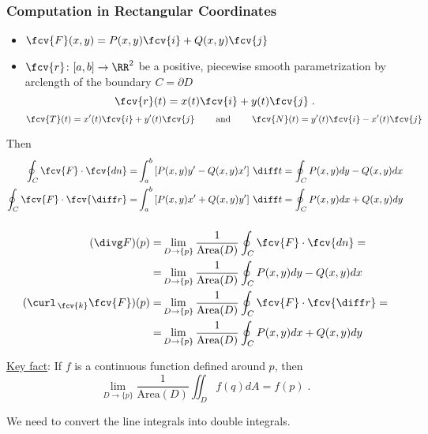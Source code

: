 \begin{frame}
  \frametitle{Computation in Rectangular Coordinates}
\small
\begin{itemize}
  \item $\fcv{F} (x,y) = P(x,y) \fcv{i} + Q(x,y) \fcv{j}$
  \item $\fcv{r} \colon [a,b] \to \RR^2$ be a positive, piecewise smooth parametrization by arclength of the boundary $C = \partial D$
%
$$\fcv{r}(t) = x(t) \fcv{i} + y(t) \fcv{j} \; .$$
%
$$
  \fcv{T} (t)  = x'(t) \fcv{i} + y'(t) \fcv{j} \qquad \text{ and } \qquad
  \fcv{N} (t)  = y'(t) \fcv{i} - x'(t) \fcv{j}
$$
%
\end{itemize}

Then
%
\begin{align*}
  \oint_C \fcv{F} \cdot \fcv{dn} = & \int_a^b \left[P(x,y) y' - Q(x,y) x'\right]\, \diff t  = \oint_C P(x,y) dy - Q(x,y) dx \\
%
  \oint_C \fcv{F} \cdot \fcv{\diff r} = & \int_a^b \left[P(x,y) x'+ Q(x,y) y'\right]\, \diff t  = \oint_C P(x,y) dx + Q(x,y) dy
\end{align*}

\end{frame}

\begin{frame}
  \frametitle{}

\begin{align*}
  (\divg F )(p) = & \lim_{D\to \{p\}} \frac{1}{\text{Area}(D)} \oint_C \fcv{F} \cdot \fcv{dn} = \\ = & \lim_{D\to \{p\}} \frac{1}{\text{Area}(D)} \oint_C P(x,y) dy - Q(x,y) dx \\
  (\curl_{\,\fcv{k}} \fcv{F})(p)= & \lim_{D\to \{p\}} \frac{1}{\text{Area}(D)} \oint_C \fcv{F} \cdot \fcv{\diff r} = \\ = & \lim_{D\to \{p\}} \frac{1}{\text{Area}(D)} \oint_C P(x,y) dx + Q(x,y) dy
\end{align*}

\pause \underline{Key fact}: If $f$ is a continuous function defined around $p$, then
%
$$\lim_{D \to \{p\}} \frac{1}{\text{Area}(D)} \iint_{D} f(q) dA = f(p)\; .$$

\pause We need to convert the line integrals into double integrals.
\end{frame}